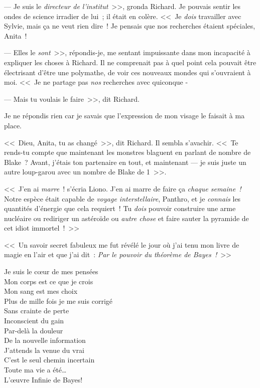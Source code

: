 --- Je suis le \emph{directeur de l'institut}~>>, gronda Richard. Je pouvais sentir les ondes de science irradier de lui~; il était en colère. <<~Je \emph{dois} travailler avec Sylvie, mais ça ne veut rien dire~! Je pensais que nos recherches étaient spéciales, Anita~!

--- Elles le \emph{sont}~>>, répondis-je, me sentant impuissante dans mon incapacité à expliquer les choses à Richard. Il ne comprenait pas à quel point cela pouvait être électrisant d'être une polymathe, de voir ces nouveaux mondes qui s'ouvraient à moi. <<~Je ne partage pas \emph{nos} recherches avec quiconque -

--- Mais tu voulais le faire~>>, dit Richard.

Je ne répondis rien car je savais que l'expression de mon visage le faisait à ma place.

<<~Dieu, Anita, tu as changé~>>, dit Richard. Il sembla s'avachir. <<~Te rends-tu compte que maintenant les monstres blaguent en parlant de nombre de Blake~? Avant, j'étais ton partenaire en tout, et maintenant — je suis juste un autre loup-garou avec un nombre de Blake de 1~>>.


<<~J'en ai \emph{marre}~! s'écria Liono. J'en ai marre de faire ça \emph{chaque semaine~!} Notre espèce était capable de \emph{voyage interstellaire}, Panthro, et je \emph{connais} les quantités d'énergie que cela requiert~! Tu \emph{dois} pouvoir construire une arme nucléaire ou rediriger un astéroïde ou \emph{autre chose} et faire sauter la pyramide de cet idiot immortel~!~>>

\clearpage
{}

<<~Un savoir secret fabuleux me fut révélé le jour où j'ai tenu mon livre de magie en l'air et que j'ai dit~: \emph{Par le pouvoir du théorème de Bayes~!}~>>


\begin{emph}
Je suis le cœur de mes pensées\\
Mon corps est ce que je crois\\
Mon sang est mes choix\\
Plus de mille fois je me suis corrigé\\
Sans crainte de perte\\
Inconscient du gain\\
Par-delà la douleur\\
De la nouvelle information\\
J'attends la venue du vrai\\
C'est le seul chemin incertain\\
Toute ma vie a été…\\
L'œuvre Infinie de Bayes!
\end{emph}

